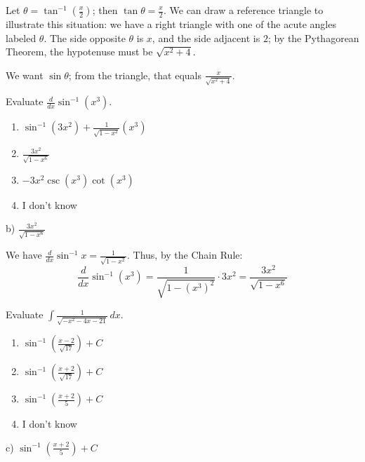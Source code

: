 \documentclass[addpoints,12pt,answers]{exam}
\begin{document}
\begin{questions}
\begin{solution}
    Let $\displaystyle\theta=\tan^{-1}\left(\frac{x}{2}\right)$; then $\displaystyle\tan\theta=\frac{x}{2}$. We can draw a reference triangle to illustrate this situation: we have a right triangle with one of the acute angles labeled $\theta$. The side opposite $\theta$ is $x$, and the side adjacent is $2$; by the Pythagorean Theorem, the hypotenuse must be $\sqrt{x^2+4}$.
    \begin{center}
    \end{center}
    We want $\sin\theta$; from the triangle, that equals $\displaystyle\frac{x}{\sqrt{x^2+4}}$.
  \end{solution}
  \newpage
  \question
  Evaluate $\displaystyle\frac{d}{dx}\sin^{-1}(x^3)$.
  \begin{enumerate}[label=\alph*)]
    \item
    $\displaystyle\sin^{-1}(3x^2)+\frac{1}{\sqrt{1-x^2}}(x^3)$
    \item
    $\displaystyle\frac{3x^2}{\sqrt{1-x^6}}$    
    \item
    $-3x^2\csc(x^3)\cot(x^3)$
    \item
    I don't know
  \end{enumerate}
  \begin{solution}
    b) $\displaystyle\frac{3x^2}{\sqrt{1-x^6}}$
    
    We have $\displaystyle\frac{d}{dx}\sin^{-1}x=\frac{1}{\sqrt{1-x^2}}$. Thus, by the Chain Rule:
    $$\frac{d}{dx}\sin^{-1}(x^3)=\frac{1}{\sqrt{1-(x^3)^2}}\cdot 3x^2=\frac{3x^2}{\sqrt{1-x^6}}$$
  \end{solution}
  \newpage
  \question
  Evaluate $\displaystyle\int\frac{1}{\sqrt{-x^2-4x-21}}\,dx$.
  \begin{enumerate}[label=\alph*)]
    \item
    $\displaystyle\sin^{-1}\left(\frac{x-2}{\sqrt{17}}\right)+C$
    \item
    $\displaystyle\sin^{-1}\left(\frac{x+2}{\sqrt{17}}\right)+C$
    \item
    $\displaystyle\sin^{-1}\left(\frac{x+2}{5}\right)+C$
    \item
    I don't know
  \end{enumerate}
  \begin{solution}
    c) $\displaystyle\sin^{-1}\left(\frac{x+2}{5}\right)+C$
    

\end{solution}
\end{questions}
\end{document}
